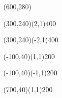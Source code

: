 \documentclass[12pt]{article}
\begin{document}
\begin{figure}[htb]
\hspace*{\fill}
\begin{egame}(600,280)

\renewcommand{\egarrowstyle}{}

%
\putbranch(300,240)(2,1){400}

\renewcommand{\egarrowstyle}{e}

\putbranch(300,240)(-2,1){400}

\renewcommand{\egarrowstyle}{}

\putbranch(-100,40)(1,1){200}

\renewcommand{\egarrowstyle}{e}

\putbranch(-100,40)(-1,1){200}

\renewcommand{\egarrowstyle}{}

\putbranch(700,40)(1,1){200}

\renewcommand{\egarrowstyle}{e}


\end{egame}
\end{figure}
\end{document}
